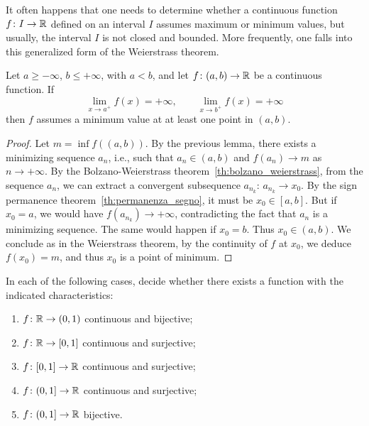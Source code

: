 It often happens that one needs to determine whether a continuous function
$f\colon I\to {\mathbb R}$ defined on an interval $I$ assumes maximum or minimum values,
but usually, the interval $I$ is not closed and bounded. More frequently, one
falls into this generalized form of the Weierstrass theorem.
\begin{theorem}%
  \label{th:weierstrass_generalizzato}%
  \mymark{***}%
Let $a\ge -\infty$, $b\le +\infty$, with $a<b$, and let $f\colon (a,b)\to {\mathbb R}$
be a continuous function.
If 
\[
 \lim_{x\to a^+} f(x) = +\infty, \qquad 
 \lim_{x\to b^+} f(x) = +\infty
\]
then $f$ assumes a minimum value at at least one point in $(a,b)$.
\end{theorem}
\begin{proof}
Let $m=\inf f((a,b))$.
By the previous lemma, there exists a minimizing sequence $a_n$, i.e., such that
$a_n \in (a,b)$ and $f(a_n)\to m$ as $n\to +\infty$.
By the Bolzano-Weierstrass theorem~\ref{th:bolzano_weierstrass}, from the
sequence $a_n$, we can extract a convergent subsequence $a_{n_k}$: $a_{n_k} \to
x_0$.
By the sign permanence theorem~\ref{th:permanenza_segno}, it must be $x_0 \in
[a,b]$.
But if $x_0=a$, we would have $f(a_{n_k}) \to +\infty$, contradicting the fact
that $a_n$ is a minimizing sequence.
The same would happen if $x_0=b$. Thus $x_0 \in (a,b)$.
We conclude as in the Weierstrass theorem, by the continuity of $f$ at $x_0$, we
deduce $f(x_0) = m$, and thus $x_0$ is a point of minimum.
\end{proof}

\begin{exercise}
In each of the following cases, decide whether there exists a function with the
indicated characteristics:
\begin{enumerate}
  \item $f\colon {\mathbb R}\to (0,1)$ continuous and bijective;
  \item $f\colon {\mathbb R}\to [0,1]$ continuous and surjective;
  \item $f\colon [0,1]\to {\mathbb R}$ continuous and surjective;
  \item $f\colon (0,1]\to {\mathbb R}$ continuous and surjective;
  \item $f\colon (0,1]\to {\mathbb R}$ bijective. 
\end{enumerate}
\end{exercise}
